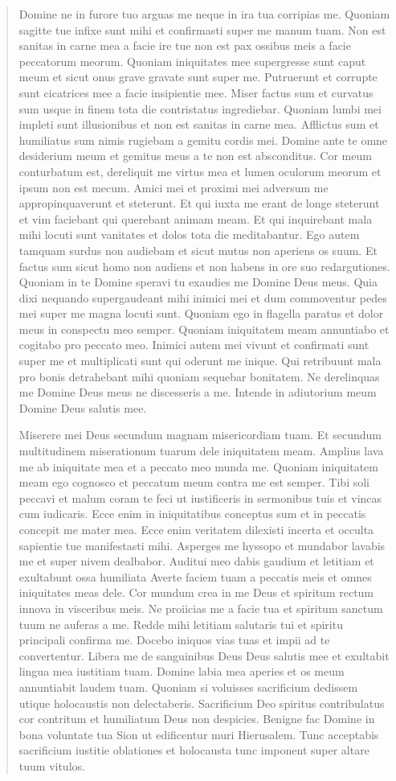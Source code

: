 \documentclass[a4paper,12pt,twoside]{book}
\begin{document}
\begin{quotation}
Domine ne in furore tuo arguas me neque in ira tua corripias me.
Quoniam sagitte tue infixe sunt mihi et confirmasti super me manum tuam.
Non est sanitas in carne mea a facie ire tue non est pax ossibus meis a facie peccatorum meorum.
Quoniam iniquitates mee supergresse sunt caput meum et sicut onus grave gravate sunt super me.
Putruerunt et corrupte sunt cicatrices mee a facie insipientie mee.
Miser factus sum et curvatus sum usque in finem tota die contristatus ingrediebar.
Quoniam lumbi mei impleti sunt illusionibus et non est sanitas in carne mea.
Afflictus sum et humiliatus sum nimis rugiebam a gemitu cordis mei.
Domine ante te omne desiderium meum et gemitus meus a te non est absconditus.
Cor meum conturbatum est, dereliquit me virtus mea et lumen oculorum meorum et ipsum non est mecum.
Amici mei et proximi mei adversum me appropinquaverunt et steterunt. 
Et qui iuxta me erant de longe steterunt et vim faciebant qui querebant animam meam.
Et qui inquirebant mala mihi locuti sunt vanitates et dolos tota die meditabantur.
Ego autem tamquam surdus non audiebam et sicut mutus non aperiens os suum.
Et factus sum sicut homo non audiens et non habens in ore suo redargutiones.
Quoniam in te Domine speravi tu exaudies me Domine Deus meus.
Quia dixi nequando supergaudeant mihi inimici mei et dum commoventur pedes mei super me magna locuti sunt.
Quoniam ego in flagella paratus et dolor meus in conspectu meo semper.
Quoniam iniquitatem meam annuntiabo et cogitabo pro peccato meo.
Inimici autem mei vivunt et confirmati sunt super me et multiplicati sunt qui oderunt me inique.
Qui retribuunt mala pro bonis detrahebant mihi quoniam sequebar bonitatem.
Ne derelinquas me Domine Deus meus ne discesseris a me.
Intende in adiutorium meum Domine Deus salutis mee.

Miserere mei Deus secundum magnam misericordiam tuam. 
Et secundum multitudinem miserationum tuarum dele iniquitatem meam.
Amplius lava me ab iniquitate mea et a peccato meo munda me.
Quoniam iniquitatem meam ego cognosco et peccatum meum contra me est semper.
Tibi soli peccavi et malum coram te feci ut iustificeris in sermonibus tuis et vincas cum iudicaris.
Ecce enim in iniquitatibus conceptus sum et in peccatis concepit me mater mea.
Ecce enim veritatem dilexisti incerta et occulta sapientie tue manifestasti mihi.
Asperges me hyssopo et mundabor lavabis me et super nivem dealbabor.
Auditui meo dabis gaudium et letitiam et exultabunt ossa humiliata
Averte faciem tuam a peccatis meis et omnes iniquitates meas dele.
Cor mundum crea in me Deus et spiritum rectum innova in visceribus meis.
Ne proiicias me a facie tua et spiritum sanctum tuum ne auferas a me.
Redde mihi letitiam salutaris tui et spiritu principali confirma me.
Docebo iniquos vias tuas et impii ad te convertentur.
Libera me de sanguinibus Deus Deus salutis mee et exultabit lingua mea iustitiam tuam.
Domine labia mea aperies et os meum annuntiabit laudem tuam.
Quoniam si voluisses sacrificium dedissem utique holocaustis non delectaberis.
Sacrificium Deo spiritus contribulatus cor contritum et humiliatum Deus non despicies.
Benigne fac Domine in bona voluntate tua Sion ut edificentur muri Hierusalem.
Tunc acceptabis sacrificium iustitie oblationes et holocausta tunc imponent super altare tuum vitulos.


\end{quotation}
\end{document}
